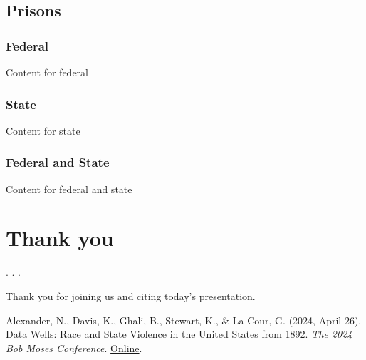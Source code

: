 \documentclass[
  letterpaper,
  DIV=11,
  numbers=noendperiod]{scrartcl}
\begin{document}
\hypertarget{prisons-2}{%
\subsection{Prisons}\label{prisons-2}}

\subsubsection{Federal}

Content for federal

\subsubsection{State}

Content for state

\subsubsection{Federal and State}

Content for federal and state

\hypertarget{thank-you}{%
\section{Thank you}\label{thank-you}}

. . .

Thank you for joining us and citing today's presentation.

Alexander, N., Davis, K., Ghali, B., Stewart, K., \& La Cour, G. (2024,
April 26). Data Wells: Race and State Violence in the United States from
1892. \emph{The 2024 Bob Moses Conference}.
\href{https://www.bobmosesconference.com/}{Online}.
\end{document}

